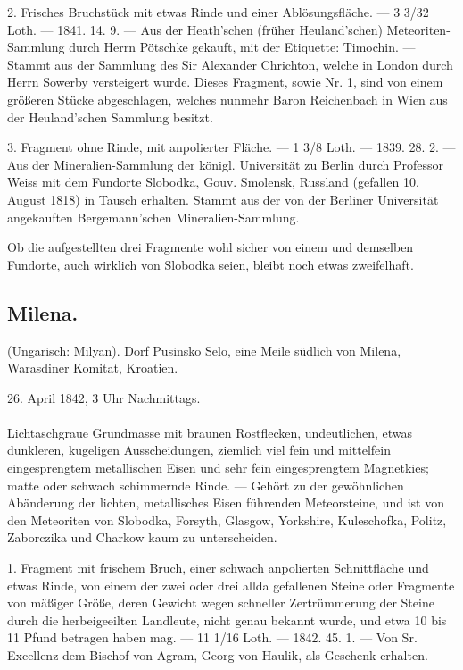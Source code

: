 \documentclass[a4paper, 11pt, oneside, polutonikogreek, german]{article}
\begin{document}
2. Frisches Bruchstück mit etwas Rinde und einer Ablösungsfläche. — 3 3/32 Loth. — 1841. 14. 9. — Aus der Heath'schen (früher Heuland'schen) Meteoriten-Sammlung durch Herrn Pötschke gekauft, mit der Etiquette: Timochin. — Stammt aus der Sammlung des Sir Alexander Chrichton, welche in London durch Herrn Sowerby versteigert wurde. Dieses Fragment, sowie Nr. 1, sind von einem größeren Stücke abgeschlagen, welches nunmehr Baron Reichenbach in Wien aus der Heuland'schen Sammlung besitzt.

3. Fragment ohne Rinde, mit anpolierter Fläche. — 1 3/8 Loth. — 1839. 28. 2. — Aus der Mineralien-Sammlung der königl. Universität zu Berlin durch Professor Weiss mit dem Fundorte Slobodka‚ Gouv. Smolensk, Russland (gefallen 10. August 1818) in Tausch erhalten. Stammt aus der von der Berliner Universität angekauften Bergemann’schen Mineralien-Sammlung.

Ob die aufgestellten drei Fragmente wohl sicher von einem und demselben Fundorte, auch wirklich von Slobodka seien, bleibt noch etwas zweifelhaft.
\subsection{Milena.}
\begin{center}
\small
(Ungarisch: Milyan). Dorf Pusinsko Selo, eine Meile südlich von Milena, Warasdiner Komitat, Kroatien.

26. April 1842, 3 Uhr Nachmittags.
\end{center}
\paragraph{}
Lichtaschgraue Grundmasse mit braunen Rostflecken, undeutlichen, etwas dunkleren, kugeligen Ausscheidungen, ziemlich viel fein und mittelfein eingesprengtem metallischen Eisen und sehr fein eingesprengtem Magnetkies; matte oder schwach schimmernde Rinde. — Gehört zu der gewöhnlichen Abänderung der lichten, metallisches Eisen führenden Meteorsteine, und ist von den Meteoriten von Slobodka, Forsyth, Glasgow, Yorkshire, Kuleschofka, Politz, Zaborczika und Charkow kaum zu unterscheiden.

1. Fragment mit frischem Bruch, einer schwach anpolierten Schnittfläche und etwas Rinde, von einem der zwei oder drei allda gefallenen Steine oder Fragmente von mäßiger Größe, deren Gewicht wegen schneller Zertrümmerung der Steine durch die herbeigeeilten Landleute, nicht genau bekannt wurde, und etwa 10 bis 11 Pfund betragen haben mag. — 11 1/16 Loth. — 1842. 45. 1. — Von Sr. Excellenz dem Bischof von Agram, Georg von Haulik, als Geschenk erhalten.
\end{document}
